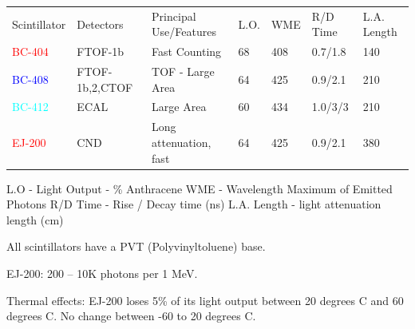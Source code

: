                
            \begin{table}[H]
                \centering
                    \begin{tabular}{lllllll}
                        Scintillator                    & Detectors             &   Principal Use/Features      &   L.O. & WME & R/D Time & L.A. Length \\
                         \textcolor{red}{BC-404}       &  FTOF-1b              &   Fast Counting                   &           68    &   408    & 0.7/1.8           &   140   \\
                         \textcolor{blue}{BC-408}       &  FTOF-1b,2,CTOF       &   TOF - Large Area                &           64    &   425   &   0.9/2.1         &   210  \\
                        \textcolor{cyan}{BC-412}        &  ECAL                 &   Large Area                      &           60   &   434 &   1.0/3/3         &   210\\
                        \textcolor{red}{EJ-200}        &  CND                  &   Long attenuation, fast   &           64     &   425       &   0.9/2.1         &   380   \\
                    \end{tabular}
            \end{table}   
            
            L.O - Light Output - \% Anthracene
            WME - Wavelength Maximum of Emitted Photons
            R/D Time - Rise / Decay time (ns)
            L.A. Length - light attenuation length (cm)
             
             All scintillators have a PVT (Polyvinyltoluene) base. 
             
             EJ-200:          200 -- 10K photons per 1 MeV. 
             
             Thermal effects: EJ-200 loses 5\% of its light output between 20 degrees C and 60 degrees C. No change between -60 to 20 degrees C. 
            
